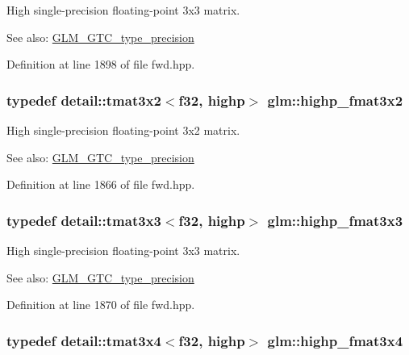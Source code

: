 High single-precision floating-point 3x3 matrix. \begin{Desc}
\item[See also:]\hyperlink{group__gtc__type__precision}{GLM\_\-GTC\_\-type\_\-precision} \end{Desc}


Definition at line 1898 of file fwd.hpp.\hypertarget{group__gtc__type__precision_gd5c083691eb15539fd81e27e1dc6b813}{
\subsubsection[highp\_\-fmat3x2]{\setlength{\rightskip}{0pt plus 5cm}typedef detail::tmat3x2$<$f32, highp$>$ {\bf glm::highp\_\-fmat3x2}}}
\label{group__gtc__type__precision_gd5c083691eb15539fd81e27e1dc6b813}


High single-precision floating-point 3x2 matrix. \begin{Desc}
\item[See also:]\hyperlink{group__gtc__type__precision}{GLM\_\-GTC\_\-type\_\-precision} \end{Desc}


Definition at line 1866 of file fwd.hpp.\hypertarget{group__gtc__type__precision_gf1d697243b1de74a5769c49e68b1e2a6}{
\subsubsection[highp\_\-fmat3x3]{\setlength{\rightskip}{0pt plus 5cm}typedef detail::tmat3x3$<$f32, highp$>$ {\bf glm::highp\_\-fmat3x3}}}
\label{group__gtc__type__precision_gf1d697243b1de74a5769c49e68b1e2a6}


High single-precision floating-point 3x3 matrix. \begin{Desc}
\item[See also:]\hyperlink{group__gtc__type__precision}{GLM\_\-GTC\_\-type\_\-precision} \end{Desc}


Definition at line 1870 of file fwd.hpp.\hypertarget{group__gtc__type__precision_g1f377a3da21dd6c418ec3a5119a4514a}{
\subsubsection[highp\_\-fmat3x4]{\setlength{\rightskip}{0pt plus 5cm}typedef detail::tmat3x4$<$f32, highp$>$ {\bf glm::highp\_\-fmat3x4}}}
\label{group__gtc__type__precision_g1f377a3da21dd6c418ec3a5119a4514a}


